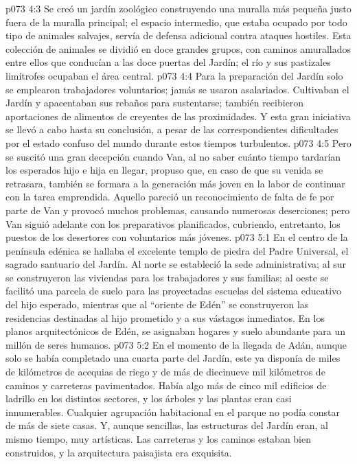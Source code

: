 \vs p073 4:3 Se creó un jardín zoológico construyendo una muralla más pequeña justo fuera de la muralla principal; el espacio intermedio, que estaba ocupado por todo tipo de animales salvajes, servía de defensa adicional contra ataques hostiles. Esta colección de animales se dividió en doce grandes grupos, con caminos amurallados entre ellos que conducían a las doce puertas del Jardín; el río y sus pastizales limítrofes ocupaban el área central.
\vs p073 4:4 Para la preparación del Jardín solo se emplearon trabajadores voluntarios; jamás se usaron asalariados. Cultivaban el Jardín y apacentaban sus rebaños para sustentarse; también recibieron aportaciones de alimentos de creyentes de las proximidades. Y esta gran iniciativa se llevó a cabo hasta su conclusión, a pesar de las correspondientes dificultades por el estado confuso del mundo durante estos tiempos turbulentos.
\vs p073 4:5 Pero se suscitó una gran decepción cuando Van, al no saber cuánto tiempo tardarían los esperados hijo e hija en llegar, propuso que, en caso de que su venida se retrasara, también se formara a la generación más joven en la labor de continuar con la tarea emprendida. Aquello pareció un reconocimiento de falta de fe por parte de Van y provocó muchos problemas, causando numerosas deserciones; pero Van siguió adelante con los preparativos planificados, cubriendo, entretanto, los puestos de los desertores con voluntarios más jóvenes.
\vs p073 5:1 En el centro de la península edénica se hallaba el excelente templo de piedra del Padre Universal, el sagrado santuario del Jardín. Al norte se estableció la sede administrativa; al sur se construyeron las viviendas para los trabajadores y sus familias; al oeste se facilitó una parcela de suelo para las proyectadas escuelas del sistema educativo del hijo esperado, mientras que al “oriente de Edén” se construyeron las residencias destinadas al hijo prometido y a sus vástagos inmediatos. En los planos arquitectónicos de Edén, se asignaban hogares y suelo abundante para un millón de seres humanos.
\vs p073 5:2 En el momento de la llegada de Adán, aunque solo se había completado una cuarta parte del Jardín, este ya disponía de miles de kilómetros de acequias de riego y de más de diecinueve mil kilómetros de caminos y carreteras pavimentados. Había algo más de cinco mil edificios de ladrillo en los distintos sectores, y los árboles y las plantas eran casi innumerables. Cualquier agrupación habitacional en el parque no podía constar de más de siete casas. Y, aunque sencillas, las estructuras del Jardín eran, al mismo tiempo, muy artísticas. Las carreteras y los caminos estaban bien construidos, y la arquitectura paisajista era exquisita.
